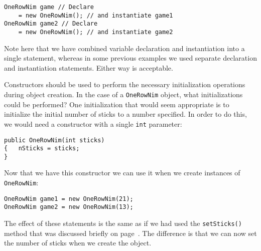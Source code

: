\begin{jjjlisting}
\begin{lstlisting}
OneRowNim game // Declare
    = new OneRowNim(); // and instantiate game1
OneRowNim game2 // Declare
    = new OneRowNim(); // and instantiate game2
\end{lstlisting}
\end{jjjlisting}

\noindent Note here that we have combined variable declaration and
instantiation into a single statement, whereas in some previous examples we
used separate declaration and instantiation statements.  Either way is
acceptable.



\noindent Constructors should be used to perform the necessary initialization
operations during object creation.   In the case of a {\tt OneRowNim}
object, what initializations could be performed?
One initialization that would seem appropriate is to initialize the
initial number of sticks to a number specified.  In order to do this,
we would need a constructor with a single {\tt int} parameter:

\begin{jjjlisting}
\begin{lstlisting}
public OneRowNim(int sticks)
{   nSticks = sticks;
}
\end{lstlisting}
\end{jjjlisting}

\noindent Now that we have this constructor we can use it
when we create instances of {\tt OneRowNim}:

\begin{jjjlisting}
\begin{lstlisting}
OneRowNim game1 = new OneRowNim(21);
OneRowNim game2 = new OneRowNim(13);
\end{lstlisting}
\end{jjjlisting}

\noindent The effect of these statements is the same as if we
had used the {\tt setSticks()} method that was discussed briefly on
page~\pageref{meth-setsticks}.  The difference is that we can now set
the number of sticks when we create the object.

